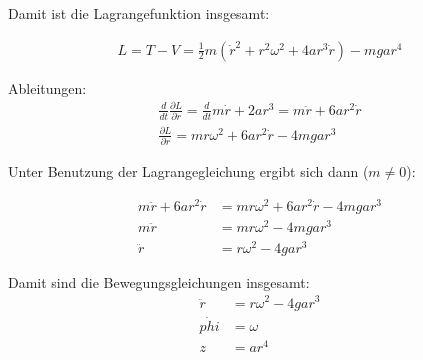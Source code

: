 \documentclass[a4paper,german,12pt,smallheadings]{scrartcl}
\begin{document}
Damit ist die Lagrangefunktion insgesamt:

\begin{align*}
  L = T - V = \frac{1}{2}m(\dot{r}^2 + r^2\omega^2 + 4ar^3\dot{r}) - mgar^4
\end{align*}

Ableitungen:
\begin{align*}
  \frac{d}{dt} \frac{\partial L}{\partial \dot{r}} = \frac{d}{dt} m\dot{r} + 2ar^3 = m\ddot{r} + 6ar^2\dot{r} \\
  \frac{\partial L}{\partial r} = mr\omega^2+6ar^2\dot{r} - 4mgar^3
\end{align*}

Unter Benutzung der Lagrangegleichung ergibt sich dann ($m \neq 0$):

\begin{align*}
  m\ddot{r} + 6ar^2\dot{r} &=  mr\omega^2 + 6ar^2\dot{r} - 4mgar^3 \\
  m\ddot{r} &= mr\omega^2 - 4mgar^3 \\
  \ddot{r} &= r\omega^2 - 4gar^3
\end{align*}

Damit sind die Bewegungsgleichungen insgesamt:
\begin{align*}
  \ddot{r} &= r\omega^2 - 4gar^3 \\
  \dot{phi} &= \omega \\
  z &= ar^4
\end{align*}
\end{document}
